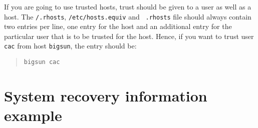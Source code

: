 If you are going to use trusted hosts, trust should be given to a user
as well as a host. The {\tt /.rhosts}, {\tt /etc/hosts.equiv} and {\tt
.rhosts} file should always contain two entries per line, one entry for
the host and an additional entry for the particular user that is to be
trusted for the host. Hence, if you want to trust user {\tt cac} from
host {\tt bigsun}, the entry should be:

\begin{quote}{\tt bigsun cac} \end{quote}


\newpage
\appendix

\section{\label{system_recovery}System recovery information example}


